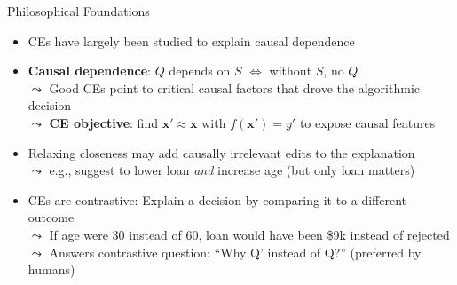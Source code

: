 \documentclass[11pt,compress,t,notes=noshow, aspectratio=169, xcolor=table, usenames,dvipsnames]{beamer}
\begin{document}
\begin{frame}{Philosophical Foundations}
  \begin{itemize}%
    \item<1-> CEs have largely been studied to explain causal dependence
    \item<1-> \textbf{Causal dependence}: $Q$ depends on $S$   $\Leftrightarrow$ without $S$, no $Q$\\
    $\leadsto$ Good CEs point to critical causal factors that drove the algorithmic decision\\
    $\leadsto$ \textbf{CE objective}: find $\mathbf{x}' \!\approx\! \mathbf{x}$ with $f(\mathbf{x}')=y'$ to expose causal features
    \item<2-> Relaxing closeness may add causally irrelevant edits to the explanation\\
$\leadsto$ e.g., suggest to lower loan \emph{and} increase age (but only loan matters)

\item<3-> CEs are contrastive: Explain a decision by comparing it to a different outcome\\
$\leadsto$ If age were 30 instead of 60, loan would have been \$9k instead of rejected\\%
$\leadsto$ Answers contrastive question: ``Why Q' instead of Q?'' (preferred by humans)

  \end{itemize}
\end{frame}















\end{document}
